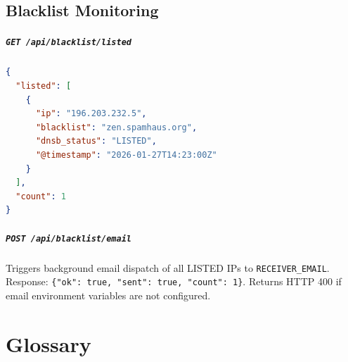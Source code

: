 \documentclass[12pt,a4paper,oneside]{report}
\begin{document}
\section*{Blacklist Monitoring}

\paragraph{\texttt{GET /api/blacklist/listed}}
\begin{lstlisting}[style=reportcode,language=json,caption={Blacklist listed response},label={lst:bllisted}]
{
  "listed": [
    {
      "ip": "196.203.232.5",
      "blacklist": "zen.spamhaus.org",
      "dnsb_status": "LISTED",
      "@timestamp": "2026-01-27T14:23:00Z"
    }
  ],
  "count": 1
}
\end{lstlisting}

\paragraph{\texttt{POST /api/blacklist/email}}
Triggers background email dispatch of all LISTED IPs to \texttt{RECEIVER\_EMAIL}.
Response: \texttt{\{"ok": true, "sent": true, "count": 1\}}.
Returns HTTP 400 if email environment variables are not configured.

\chapter{Glossary}
\end{document}

